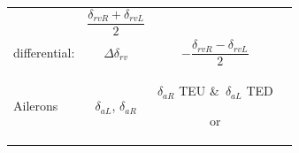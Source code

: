 \documentclass[
]{book}
\begin{document}
\begin{longtable}[]{@{}lccc@{}}
\begin{minipage}[t]{0.14\columnwidth}
\end{minipage} & \begin{minipage}[t]{0.29\columnwidth}\centering
\[\frac{\delta_{rvR}+\delta_{rvL}}{2}\]\strut
\end{minipage} & \begin{minipage}[t]{0.27\columnwidth}\centering
\strut
\end{minipage}\tabularnewline
\begin{minipage}[t]{0.19\columnwidth}\raggedright
differential:\strut
\end{minipage} & \begin{minipage}[t]{0.14\columnwidth}\centering
\(\Delta\delta_{rv}\)\strut
\end{minipage} & \begin{minipage}[t]{0.29\columnwidth}\centering
\[-\frac{\delta_{rvR} - \delta_{rvL}}{2}\]\strut
\end{minipage} & \begin{minipage}[t]{0.27\columnwidth}\centering
\strut
\end{minipage}\tabularnewline
\begin{minipage}[t]{0.19\columnwidth}\raggedright
Ailerons\strut
\end{minipage} & \begin{minipage}[t]{0.14\columnwidth}\centering
\(\delta_{aL}\),
\(\delta_{aR}\)\strut
\end{minipage} & \begin{minipage}[t]{0.29\columnwidth}\centering
\(\delta_{aR}\) TEU \&~\(\delta_{aL}\) TED

or


\end{minipage}
\end{longtable}
\end{document}
